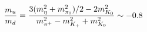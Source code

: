 \begin{equation}
{m_u\over m_d}=
{
 3(m_{\eta}^2+m_{\pi_0}^2)/2-2m_{K_0}^2
\over
 m_{\pi^+}^2-m_{K_+}^2+m_{K_0}^2
}
\sim-0.8
\end{equation}

